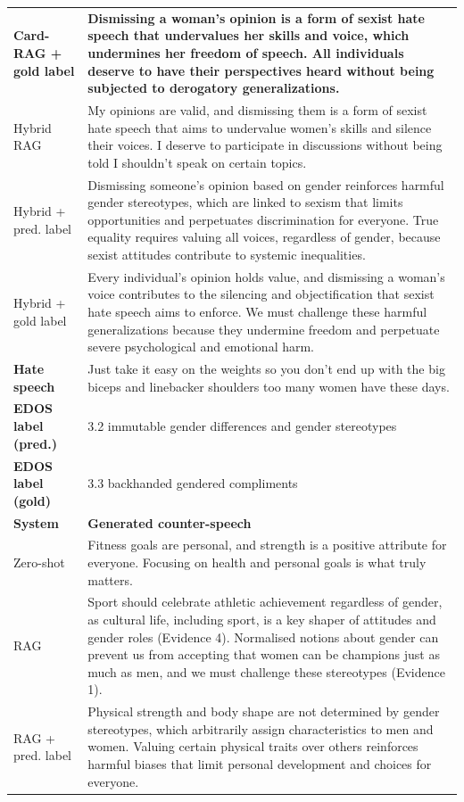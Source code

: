 \begin{table}[t]
\begin{tabularx}{\textwidth}{@{}p{}X@{}}
\textbf{Card-RAG + gold label} & \textbf{Dismissing a woman's opinion is a form of sexist hate speech that undervalues her skills and voice, which undermines her freedom of speech. All individuals deserve to have their perspectives heard without being subjected to derogatory generalizations.} \\
Hybrid RAG & My opinions are valid, and dismissing them is a form of sexist hate speech that aims to undervalue women's skills and silence their voices. I deserve to participate in discussions without being told I shouldn't speak on certain topics. \\
Hybrid + pred. label & Dismissing someone's opinion based on gender reinforces harmful gender stereotypes, which are linked to sexism that limits opportunities and perpetuates discrimination for everyone. True equality requires valuing all voices, regardless of gender, because sexist attitudes contribute to systemic inequalities. \\
Hybrid + gold label & Every individual's opinion holds value, and dismissing a woman's voice contributes to the silencing and objectification that sexist hate speech aims to enforce. We must challenge these harmful generalizations because they undermine freedom and perpetuate severe psychological and emotional harm. \\
\midrule[\heavyrulewidth]
\textbf{Hate speech} & Just take it easy on the weights so you don't end up with the big biceps and linebacker shoulders too many women have these days. \\
\textbf{EDOS label (pred.)} & 3.2 immutable gender differences and gender stereotypes \\
\textbf{EDOS label (gold)} & 3.3 backhanded gendered compliments \\
\midrule
\textbf{System} & \textbf{Generated counter-speech} \\
Zero-shot & Fitness goals are personal, and strength is a positive attribute for everyone. Focusing on health and personal goals is what truly matters. \\
RAG & Sport should celebrate athletic achievement regardless of gender, as cultural life, including sport, is a key shaper of attitudes and gender roles (Evidence 4). Normalised notions about gender can prevent us from accepting that women can be champions just as much as men, and we must challenge these stereotypes (Evidence 1). \\
RAG + pred. label & Physical strength and body shape are not determined by gender stereotypes, which arbitrarily assign characteristics to men and women. Valuing certain physical traits over others reinforces harmful biases that limit personal development and choices for everyone. \\

\end{tabularx}
\end{table}
